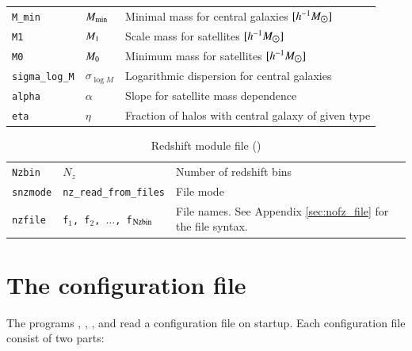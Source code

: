 \documentclass[11pt, chapterprefix, headsepline]{scrartcl}
\def\sun{\hbox{$\odot$}}
\begin{document}
\begin{table}
\begin{minipage}{\textwidth}
\begin{tabularx}{\textwidth}{llX}
      \texttt{M\_min} & $M_{\rm min}$ & Minimal mass for central galaxies $[h^{-1} M_{\sun}]$\\
      \texttt{M1}  & $M_{\rm 1}$ & Scale mass for satellites $[h^{-1} M_{\sun}]$\\
      \texttt{M0}  & $M_{\rm 0}$ & Minimum mass for satellites $[h^{-1} M_{\sun}]$\\
      \texttt{sigma\_log\_M} & $\sigma_{\log M}$ & Logarithmic
      dispersion for central galaxies \\
      \texttt{alpha} & $\alpha$ & Slope for satellite mass dependence \\
      \texttt{eta}   & $\eta$   & Fraction of halos with central galaxy of given type \\
      \hline\hline
    \end{tabularx}
  \end{minipage}

\end{table}


\begin{table}
  
  \caption{Redshift module file ()}
  \label{tab:nofz.par}
  
  \begin{minipage}{\textwidth}
    \begin{tabularx}{\textwidth}{llX} \hline \hline
      \texttt{Nzbin} & $N_z$ & Number of redshift bins \\
      \texttt{snzmode} & \texttt{nz\_read\_from\_files} & File mode \\
      \texttt{nzfile}  & \texttt{f$_1$, f$_2$,
        $\ldots$, f$_{\rm Nzbin}$} & File names. See Appendix
      \ref{sec:nofz_file} for the file syntax. \\
      \hline\hline
    \end{tabularx}
  \end{minipage}

\end{table}


\section{The configuration file}
\label{sec:config_file}

The programs , ,
, and  read a
configuration file on startup. Each configuration file consist of two
parts:
\end{document}

